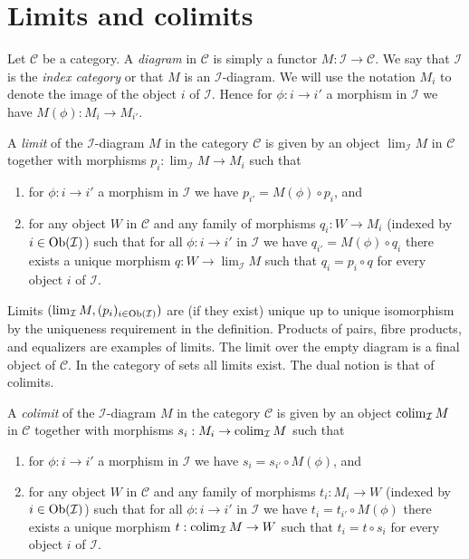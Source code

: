 \section{Limits and colimits}
\label{section-limits}

\noindent
Let $\mathcal{C}$ be a category. A {\it diagram} in $\mathcal{C}$ is
simply a functor $M : \mathcal{I} \to \mathcal{C}$. We say that
$\mathcal{I}$ is the {\it index category} or that $M$ is an
$\mathcal{I}$-diagram. We will use the notation $M_i$ to denote the
image of the object
$i$ of $\mathcal{I}$. Hence for $\phi : i \to i'$ a morphism
in $\mathcal{I}$ we have $M(\phi) : M_i \to M_{i'}$.

\begin{definition}
\label{definition-limit}
A {\it limit} of the $\mathcal{I}$-diagram $M$ in the category
$\mathcal{C}$ is given by an object $\lim_\mathcal{I} M$ in $\mathcal{C}$
together with morphisms $p_i : \lim_\mathcal{I} M \to M_i$ such that
\begin{enumerate}
\item for $\phi : i \to i'$ a morphism
in $\mathcal{I}$ we have $p_{i'} = M(\phi) \circ p_i$, and
\item for any object $W$ in $\mathcal{C}$ and any family of
morphisms $q_i : W \to M_i$ (indexed by $i \in \mathop{\mathrm{Ob}}\nolimits(\mathcal{I})$)
such that for all $\phi : i \to i'$
in $\mathcal{I}$ we have $q_{i'} = M(\phi) \circ q_i$ there
exists a unique morphism $q : W \to \lim_\mathcal{I} M$ such that
$q_i = p_i \circ q$ for every object $i$ of $\mathcal{I}$.
\end{enumerate}
\end{definition}

\noindent
Limits $(\mathop{\mathrm{lim}}\nolimits_\mathcal{I} M, (p_i)_{i\in \mathop{\mathrm{Ob}}\nolimits(\mathcal{I})})$ are
(if they exist)
unique up to unique isomorphism by the uniqueness requirement
in the definition. Products of pairs, fibre products, and equalizers are
examples of limits. The limit over the empty diagram is a final object
of $\mathcal{C}$.
In the category of sets all limits exist.
The dual notion is that of colimits.

\begin{definition}
\label{definition-colimit}
A {\it colimit} of the $\mathcal{I}$-diagram $M$ in the category
$\mathcal{C}$ is given by an object $\mathop{\mathrm{colim}}\nolimits_\mathcal{I} M$ in $\mathcal{C}$
together with morphisms $s_i : M_i \to \mathop{\mathrm{colim}}\nolimits_\mathcal{I} M$ such that
\begin{enumerate}
\item for $\phi : i \to i'$ a morphism
in $\mathcal{I}$ we have $s_i = s_{i'} \circ M(\phi)$, and
\item for any object $W$ in $\mathcal{C}$ and any family of
morphisms $t_i : M_i \to W$ (indexed by $i \in \mathop{\mathrm{Ob}}\nolimits(\mathcal{I})$)
such that for all $\phi : i \to i'$
in $\mathcal{I}$ we have $t_i = t_{i'} \circ M(\phi)$ there
exists a unique morphism $t : \mathop{\mathrm{colim}}\nolimits_\mathcal{I} M \to W$ such that
$t_i = t \circ s_i$ for every object $i$ of $\mathcal{I}$.
\end{enumerate}
\end{definition}

